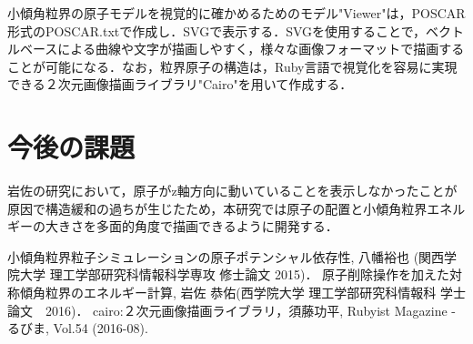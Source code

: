 \documentclass[a4j,twocolumn]{jsarticle}
\begin{document}
小傾角粒界の原子モデルを視覚的に確かめるためのモデル"Viewer"は，POSCAR形式のPOSCAR.txtで作成し．SVGで表示する．SVGを使用することで，ベクトルベースによる曲線や文字が描画しやすく，様々な画像フォーマットで描画することが可能になる．なお，粒界原子の構造は，Ruby言語で視覚化を容易に実現できる２次元画像描画ライブラリ"Cairo"を用いて作成する\cite{sudoh}．

\section{今後の課題}
岩佐の研究において，原子がz軸方向に動いていることを表示しなかったことが原因で構造緩和の過ちが生じたため，本研究では原子の配置と小傾角粒界エネルギーの大きさを多面的角度で描画できるように開発する．

\begin{thebibliography}{9}
 小傾角粒界粒子シミュレーションの原子ポテンシャル依存性, 八幡裕也 (関西学院大学 理工学部研究科情報科学専攻 修士論文 2015)．
 原子削除操作を加えた対称傾角粒界のエネルギー計算, 岩佐 恭佑(西学院大学 理工学部研究科情報科 学士論文　2016)． 
 cairo:２次元画像描画ライブラリ，須藤功平, Rubyist Magazine - るびま, Vol.54 (2016-08).
\end{thebibliography}
\end{document}
